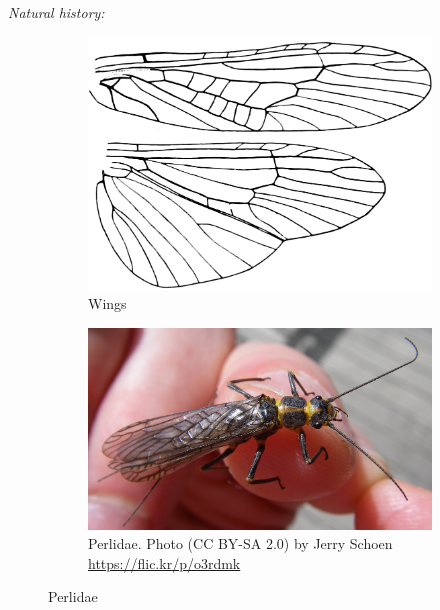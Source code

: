 \documentclass[letterpaper, 11pt]{article}
\begin{document}
\noindent{}\textit{Natural history:} \\ 

\begin{figure}[ht!]
    \centering
    \begin{subfigure}[ht!]{0.45\textwidth}
        \includegraphics[width=\textwidth]{PerlidWings}
        \caption{Wings \citep[modified from][Plate 11, Fig. 3]{bhl29875}}
        \label{fig:perlid1}
    \end{subfigure}
    \qquad
    \begin{subfigure}[ht!]{0.45\textwidth}
        \includegraphics[width=\textwidth]{perlid}
        \caption{Perlidae. Photo (CC BY-SA 2.0) by Jerry Schoen \url{https://flic.kr/p/o3rdmk}}
        \label{fig:perlid2}
    \end{subfigure}
    \caption{Perlidae}\label{fig:perlids}
\end{figure}
\end{document}
